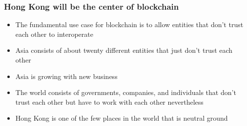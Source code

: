 \documentclass{beamer}
\begin{document}
\begin{frame}
  \frametitle{Hong Kong will be the center of blockchain}
  \begin{itemize}
    \item The fundamental use case for blockchain is to allow entities
      that don't trust each other to interoperate
    \item Asia consists of about twenty different entities that just
      don't trust each other
    \item Asia is growing with new business
    \item The world consists of governments, companies, and
      individuals that don't trust each other but have to work with
      each other nevertheless
    \item Hong Kong is one of the few places in the world that is
      neutral ground
  \end{itemize}
\end{frame}
\end{document}
